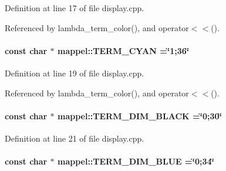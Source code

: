 Definition at line 17 of file display.\+cpp.



Referenced by lambda\+\_\+term\+\_\+color(), and operator$<$$<$().

\paragraph[{\texorpdfstring{T\+E\+R\+M\+\_\+\+C\+Y\+AN}{TERM_CYAN}}]{\setlength{\rightskip}{0pt plus 5cm}const char $\ast$ mappel\+::\+T\+E\+R\+M\+\_\+\+C\+Y\+AN =\char`\"{}1;36\char`\"{}}\hypertarget{namespacemappel_ad7696c53e61084d23f8532598b261c36}{}\label{namespacemappel_ad7696c53e61084d23f8532598b261c36}


Definition at line 19 of file display.\+cpp.



Referenced by lambda\+\_\+term\+\_\+color(), and operator$<$$<$().

\paragraph[{\texorpdfstring{T\+E\+R\+M\+\_\+\+D\+I\+M\+\_\+\+B\+L\+A\+CK}{TERM_DIM_BLACK}}]{\setlength{\rightskip}{0pt plus 5cm}const char $\ast$ mappel\+::\+T\+E\+R\+M\+\_\+\+D\+I\+M\+\_\+\+B\+L\+A\+CK =\char`\"{}0;30\char`\"{}}\hypertarget{namespacemappel_a233d1d0ed4c3957ba68364c5d9f6f45e}{}\label{namespacemappel_a233d1d0ed4c3957ba68364c5d9f6f45e}


Definition at line 21 of file display.\+cpp.

\paragraph[{\texorpdfstring{T\+E\+R\+M\+\_\+\+D\+I\+M\+\_\+\+B\+L\+UE}{TERM_DIM_BLUE}}]{\setlength{\rightskip}{0pt plus 5cm}const char $\ast$ mappel\+::\+T\+E\+R\+M\+\_\+\+D\+I\+M\+\_\+\+B\+L\+UE =\char`\"{}0;34\char`\"{}}\hypertarget{namespacemappel_a81976972f9e20d3f3ec3e541302bf465}{}\label{namespacemappel_a81976972f9e20d3f3ec3e541302bf465}


